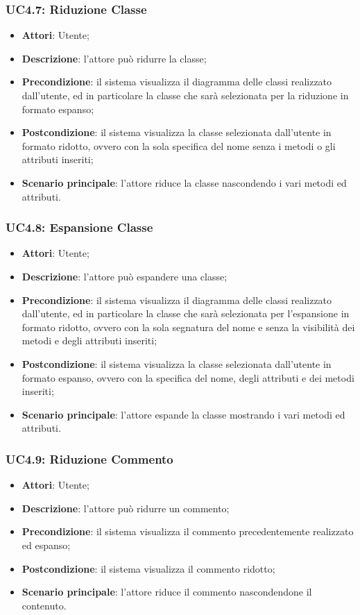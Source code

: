 \subsubsection{UC4.7: Riduzione Classe}
\label{UC4.7}
\begin{itemize}
\item \textbf{Attori}: Utente;
\item \textbf{Descrizione}: l'attore può ridurre la classe;
\item \textbf{Precondizione}: il sistema visualizza il diagramma delle classi realizzato dall'utente, ed in particolare la classe che sarà selezionata per la riduzione in formato espanso;	
\item \textbf{Postcondizione}: il sistema visualizza la classe selezionata dall'utente in formato ridotto, ovvero con la sola specifica del nome senza i metodi o gli attributi inseriti;	
\item \textbf{Scenario principale}:
l'attore riduce la classe nascondendo i vari metodi ed attributi.
\end{itemize}

\subsubsection{UC4.8: Espansione Classe	}
\label{UC4.8}
\begin{itemize}
\item \textbf{Attori}: Utente;
\item \textbf{Descrizione}: l'attore può espandere una classe;	
\item \textbf{Precondizione}: il sistema visualizza il diagramma delle classi realizzato dall'utente, ed in particolare la classe che sarà selezionata per l'espansione in formato ridotto, ovvero con la sola segnatura del nome e senza la visibilità dei metodi e degli attributi inseriti;	
\item \textbf{Postcondizione}:  il sistema visualizza la classe selezionata dall'utente in formato espanso, ovvero con la specifica del nome, degli attributi e dei metodi inseriti;
\item \textbf{Scenario principale}:
l'attore espande la classe mostrando i vari metodi ed attributi.	
\end{itemize}

\subsubsection{UC4.9: Riduzione Commento}
\label{UC4.9}
\begin{itemize}
\item \textbf{Attori}: Utente;
\item \textbf{Descrizione}: l'attore può ridurre un commento;	
\item \textbf{Precondizione}: il sistema visualizza il commento precedentemente realizzato ed espanso;	
\item \textbf{Postcondizione}: il sistema visualizza il commento ridotto;	
\item \textbf{Scenario principale}:
l'attore riduce il commento nascondendone il contenuto.	
\end{itemize}

